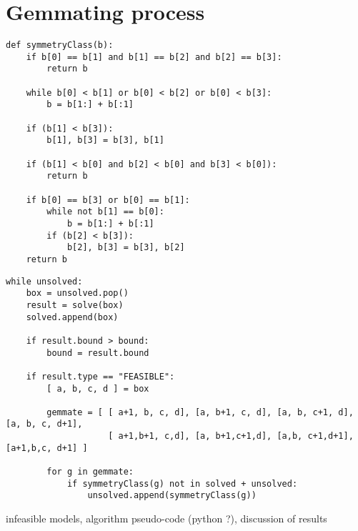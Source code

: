 \section{Gemmating process}

\begin{lstlisting}
def symmetryClass(b):
    if b[0] == b[1] and b[1] == b[2] and b[2] == b[3]:
        return b
    
    while b[0] < b[1] or b[0] < b[2] or b[0] < b[3]:
        b = b[1:] + b[:1]
    
    if (b[1] < b[3]):
        b[1], b[3] = b[3], b[1]

    if (b[1] < b[0] and b[2] < b[0] and b[3] < b[0]):
        return b
        
    if b[0] == b[3] or b[0] == b[1]:
        while not b[1] == b[0]:
            b = b[1:] + b[:1]
        if (b[2] < b[3]):
            b[2], b[3] = b[3], b[2]
    return b
\end{lstlisting}

\begin{lstlisting}
while unsolved:
    box = unsolved.pop()
    result = solve(box)
    solved.append(box)

    if result.bound > bound:
        bound = result.bound
        
    if result.type == "FEASIBLE":
        [ a, b, c, d ] = box

        gemmate = [ [ a+1, b, c, d], [a, b+1, c, d], [a, b, c+1, d], [a, b, c, d+1],
                    [ a+1,b+1, c,d], [a, b+1,c+1,d], [a,b, c+1,d+1], [a+1,b,c, d+1] ]
                    
        for g in gemmate:
            if symmetryClass(g) not in solved + unsolved:
                unsolved.append(symmetryClass(g))
\end{lstlisting}

  infeasible models, 
  algorithm pseudo-code (python ?),
  discussion of results

